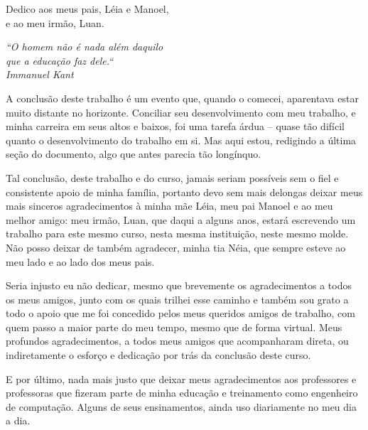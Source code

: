 \documentclass[
	11pt,
	openright,
	oneside,
	a4paper,
	english,
	french,
	spanish,
	brazil,	
	]{abntex2}
\newcommand{\quot}[1]{\begin{flushright} \textit{#1}\end{flushright}}
\begin{document}
\begin{dedicatoria}
    \vspace*{\fill}
	\begin{flushright}
		Dedico aos meus pais, Léia e Manoel,\\ e ao meu irmão, Luan.	
	\end{flushright}
\end{dedicatoria}

\begin{agradecimentos}

\quot{``O homem não é nada além daquilo\\que a educação faz dele.``\\Immanuel Kant}

A conclusão deste trabalho é um evento que, quando o comecei, aparentava estar muito distante no horizonte. Conciliar seu desenvolvimento com meu trabalho, e minha carreira em seus altos e baixos, foi uma tarefa árdua -- quase tão difícil quanto o desenvolvimento do trabalho em si. Mas aqui estou, redigindo a última seção do documento, algo que antes parecia tão longínquo.

Tal conclusão, deste trabalho e do curso, jamais seriam possíveis sem o fiel e consistente apoio de minha família, portanto devo sem mais delongas deixar meus mais sinceros agradecimentos à minha mãe Léia, meu pai Manoel e ao meu melhor amigo: meu irmão, Luan, que daqui a alguns anos, estará escrevendo um trabalho para este mesmo curso, nesta mesma instituição, neste mesmo molde. Não posso deixar de também agradecer, minha tia Néia, que sempre esteve ao meu lado e ao lado dos meus pais.

Seria injusto eu não dedicar, mesmo que brevemente os agradecimentos a todos os meus amigos, junto com os quais trilhei esse caminho e também sou grato a todo o apoio que me foi concedido pelos meus queridos amigos de trabalho, com quem passo a maior parte do meu tempo, mesmo que de forma virtual. Meus profundos agradecimentos, a todos meus amigos que acompanharam direta, ou indiretamente o esforço e dedicação por trás da conclusão deste curso.

E por último, nada mais justo que deixar meus agradecimentos aos professores e professoras que fizeram parte de minha educação e treinamento como engenheiro de computação. Alguns de seus ensinamentos, ainda uso diariamente no meu dia a dia.

\end{agradecimentos}
\end{document}
